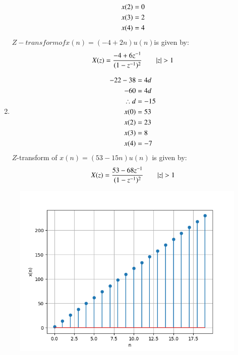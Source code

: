 \documentclass[journal,12pt,twocolumn]{IEEEtran}
\theoremstyle{remark}
\begin{document}
\begin{center}
\begin{enumerate}
\begin{align}
          x(2)&=0\\
          x(3)&=2 \\
          x(4)&=4 \notag\\
    \end{align}
    $Z-transform of x(n) = (-4 + 2n)u(n) $is given by:
    \begin{align}
       &X(z)=\frac{-4+6{z^{-1}}}{(1-{z^{-1}})^2} \qquad  |z|>1  \notag\\
    \end{align}
       \item    
     \begin{align}
         -22-38&=4d\\
          -60&=4d\\
           \therefore d&=-15\\
            x(0)&=53\\
            x(2)&=23\\
            x(3)&=8\\
            x(4)&=-7 \notag\\
     \end{align}
     $Z$-transform of $x(n) = (53 - 15n)u(n)$ is given by:
\begin{align}
       &X(z)=\frac{53-68{z^{-1}}}{(1-{z^{-1}})^2}\qquad|z|>1 \notag \\
\end{align}
\end{enumerate}             
          
\end{center}

\begin{figure}[h]
       \centering
        \includegraphics[width=1\linewidth]{ncert-maths/10/5/2/3/figs/plot1.png} %
        \caption{}
\end{figure}
\end{document}

